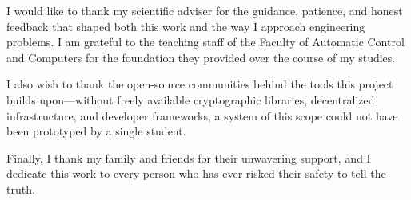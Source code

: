 
I would like to thank my scientific adviser for the guidance, patience, and
honest feedback that shaped both this work and the way I approach engineering
problems. I am grateful to the teaching staff of the Faculty of Automatic
Control and Computers for the foundation they provided over the course of my
studies.

I also wish to thank the open-source communities behind the tools this project
builds upon---without freely available cryptographic libraries, decentralized
infrastructure, and developer frameworks, a system of this scope could not have
been prototyped by a single student.

Finally, I thank my family and friends for their unwavering support, and I
dedicate this work to every person who has ever risked their safety to tell the
truth.
